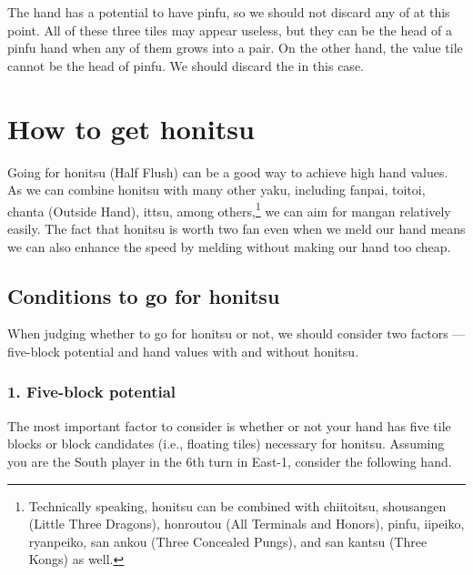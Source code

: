 \bigskip
\noindent The hand has a potential to have {\jap pinfu}, so we should not discard any of {\large{}\xi} at this point. All of these three tiles may appear useless, but they can be the head of a {\jap pinfu} hand when any of them grows into a pair. On the other hand, the value tile {\large\fa} cannot be the head of {\jap pinfu}. We should discard the {\large\fa} in this case. 

\newpage
\section{How to get {\jap honitsu}}\label{sec:hon}
Going for {\jap honitsu} (Half Flush) can be a good way to achieve high hand values. As we can combine {\jap honitsu} with many other {\jap yaku}, including {\jap fanpai}, {\jap toitoi}, {\jap chanta} (Outside Hand), {\jap ittsu}, among others,\footnote{Technically speaking, {\jap honitsu} can be combined with {\jap chiitoitsu}, {\jap shousangen} (Little Three Dragons), {\jap honroutou} (All Terminals and Honors), {\jap pinfu}, {\jap iipeiko}, {\jap ryanpeiko}, {\jap san ankou} (Three Concealed Pungs), and {\jap san kantsu} (Three Kongs) as well.}
we can aim for {\jap mangan} relatively easily.
The fact that {\jap honitsu} is worth two {\jap fan} even when we meld our hand means we can also enhance the speed by melding without making our hand too cheap.

\subsection{Conditions to go for {\jap honitsu}}
When judging whether to go for {\jap honitsu} or not, we should consider two factors --- five-block potential and hand values with and without {\jap honitsu}.

\subsubsection{1. Five-block potential}
\noindent The most important factor to consider is whether or not your hand has  five tile blocks or block candidates (i.e., floating tiles) necessary for {\jap honitsu}. Assuming you are the South player in the 6th turn in East-1, consider the following hand. 

